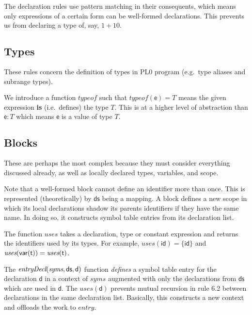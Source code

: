 \documentclass[10pt,a4paper,]{article}
\begin{document}
The declaration rules use pattern matching in their consequents, which
means only expressions of a certain form can be well-formed
declarations. This prevents us from declaring a type of, say, \(1+10\).

\hypertarget{types}{%
\subsection{Types}\label{types}}

These rules concern the definition of types in PL0 program (e.g.~type
aliases and subrange types).

We introduce a function \(\textit{typeof}\) such that
\(\textit{typeof}(\textsf{e}) =T\) means the given expression
\textbf{is} (i.e.~defines) the type \(T\). This is at a higher level of
abstraction than \(\textsf{e} : T\) which means \(\textsf{e}\) is a
value of type \(T\).

\hypertarget{blocks}{%
\subsection{Blocks}\label{blocks}}

These are perhaps the most complex because they must consider everything
discussed already, as well as locally declared types, variables, and
scope.

Note that a well-formed block cannot define an identifier more than
once. This is represented (theoretically) by \(\textsf{ds}\) being a
mapping. A block defines a new scope in which its local declarations
shadow its parents identifiers if they have the same name. In doing so,
it constructs symbol table entries from its declaration list.

The function \(\textit{uses}\) takes a declaration, type or constant
expression and returns the identifiers used by its types. For example,
\(\textit{uses}(\textsf{id})=\{\textsf{id}\}\) and
\(\textit{uses}(\textsf{var}(\textsf{t}))=\textit{uses}(\textsf t)\).

The \(\textit{entryDecl}(\textit{syms}, \textsf{ds}, \textsf d)\)
function \emph{defines} a symbol table entry for the declaration
\(\textsf{d}\) in a context of \(\textit{syms}\) augmented with only the
declarations from \(\textsf{ds}\) which are used in \(\textsf{d}\). The
\(\textit{uses}(\textsf{d})\) prevents mutual recursion in rule 6.2
between declarations in the same declaration list. Basically, this
constructs a new context and offloads the work to \(\textit{entry}\).
\end{document}
